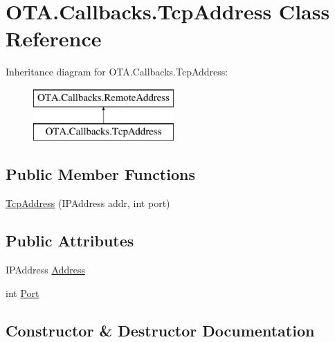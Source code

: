 \hypertarget{class_o_t_a_1_1_callbacks_1_1_tcp_address}{}\section{O\+T\+A.\+Callbacks.\+Tcp\+Address Class Reference}
\label{class_o_t_a_1_1_callbacks_1_1_tcp_address}
Inheritance diagram for O\+T\+A.\+Callbacks.\+Tcp\+Address\+:\begin{figure}[H]
\begin{center}
\leavevmode
\includegraphics[height=2.000000cm]{class_o_t_a_1_1_callbacks_1_1_tcp_address}
\end{center}
\end{figure}
\subsection*{Public Member Functions}
\begin{DoxyCompactItemize}
\item 
\hyperlink{class_o_t_a_1_1_callbacks_1_1_tcp_address_a43602edf0f52793f1af3d7a49ba1d571}{Tcp\+Address} (I\+P\+Address addr, int port)
\end{DoxyCompactItemize}
\subsection*{Public Attributes}
\begin{DoxyCompactItemize}
\item 
I\+P\+Address \hyperlink{class_o_t_a_1_1_callbacks_1_1_tcp_address_afa025f9262f5c19ffa3be8057cb84380}{Address}
\item 
int \hyperlink{class_o_t_a_1_1_callbacks_1_1_tcp_address_aa06d2c2b3b57a383d2418c8688dc10b1}{Port}
\end{DoxyCompactItemize}


\subsection{Constructor \& Destructor Documentation}
\hypertarget{class_o_t_a_1_1_callbacks_1_1_tcp_address_a43602edf0f52793f1af3d7a49ba1d571}{}

